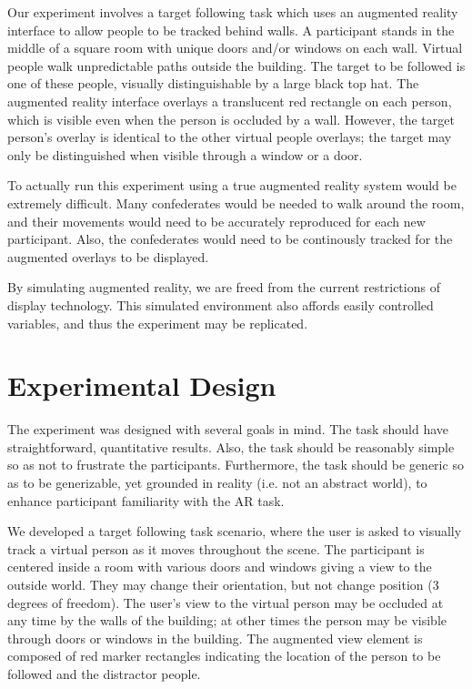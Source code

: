 \documentclass{acmsiggraph}                     %
\begin{document}
Our experiment involves a target following task which uses an augmented reality interface to allow people to be tracked behind walls.  A participant stands in the middle of a square room with unique doors and/or windows on each wall.  Virtual people walk unpredictable paths outside the building.  The target to be followed is one of these people, visually distinguishable by a large black top hat.  The augmented reality interface overlays a translucent red rectangle on each person, which is visible even when the person is occluded by a wall.  However, the target person's overlay is identical to the other virtual people overlays; the target may only be distinguished when visible through a window or a door.

To actually run this experiment using a true augmented reality system would be extremely difficult.  Many confederates would be needed to walk around the room, and their movements would need to be accurately reproduced for each new participant.  Also, the confederates would need to be continously tracked for the augmented overlays to be displayed.%

By simulating augmented reality, we are freed from the current restrictions of display technology.  This simulated environment also affords easily controlled variables, and thus the experiment may be replicated.

\section{Experimental Design}

The experiment was designed with several goals in mind.  The task should have straightforward, quantitative results.  Also, the task should be reasonably simple so as not to frustrate the participants.  Furthermore, the task should be generic so as to be generizable, yet grounded in reality (i.e. not an abstract world), to enhance participant familiarity with the AR task.

We developed a target following task scenario, where the user is asked to visually track a virtual person as it moves throughout the scene.  The participant is centered inside a room with various doors and windows giving a view to the outside world.  They may change their orientation, but not change position (3 degrees of freedom).  The user's view to the virtual person may be occluded at any time by the walls of the building; at other times the person may be visible through doors or windows in the building.  The augmented view element is composed of red marker rectangles indicating the location of the person to be followed and the distractor people.
\end{document}

